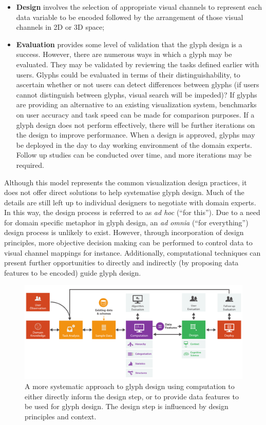 \begin{itemize}
\item \textbf{Design} involves the selection of appropriate visual channels to represent each data variable to be encoded followed by the arrangement of those visual channels in 2D or 3D space;


\item \textbf{Evaluation} provides some level of validation that the glyph design is a success.
However, there are numerous ways in which a glyph may be evaluated.
They may be validated by reviewing the tasks defined earlier with users.
Glyphs could be evaluated in terms of their distinguishability, to ascertain whether or not users can detect differences between glyphs (if users cannot distinguish between glyphs, visual search will be impeded)?
If glyphs are providing an alternative to an existing visualization system, benchmarks on user accuracy and task speed can be made for comparison purposes.
If a glyph design does not perform effectively, there will be further iterations on the design to improve performance. 
When a design is approved, glyphs may be deployed in the day to day working environment of the domain experts.
Follow up studies can be conducted over time, and more iterations may be required.
\end{itemize}

Although this model represents the common visualization design practices, it does not offer direct solutions to help systematise glyph design.
Much of the details are still left up to individual designers to negotiate with domain experts.
In this way, the design process is referred to as \emph{ad hoc} (``for this'').
Due to a need for domain specific metaphor in glyph design, an \emph{ad omnia} (``for everything'') design process is unlikely to exist.
However, through incorporation of design principles, more objective decision making can be performed to control data to visual channel mappings for instance.
Additionally, computational techniques can present further opportunities to directly and indirectly (by proposing data features to be encoded) guide glyph design.

\begin{figure}[t!]
\centering
\includegraphics[width=\textwidth]{images/ch3/model_horizontal_new}
\caption{A more systematic approach to glyph design using computation to either directly inform the design step, or to provide data features to be used for glyph design. The design step is influenced by design principles and context.}
\label{fig:new_process}
\end{figure}

